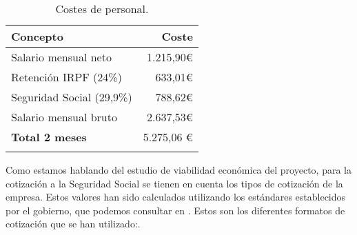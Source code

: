 \begin{longtable}[]{@{}lr@{}}
\toprule
\begin{minipage}[b]{0.38\columnwidth}\raggedright\strut
\textbf{Concepto}\strut
\end{minipage} & \begin{minipage}[b]{0.20\columnwidth}\raggedright\strut
\textbf{Coste}\strut
\end{minipage}\tabularnewline
\midrule
\endhead
\begin{minipage}[t]{0.38\columnwidth}\raggedright\strut
Salario mensual neto\strut
\end{minipage} & \begin{minipage}[t]{0.20\columnwidth}\raggedright\strut
1.215,90\euro{}\strut
\end{minipage}\tabularnewline
\begin{minipage}[t]{0.38\columnwidth}\raggedright\strut
Retención IRPF (24\%)\strut
\end{minipage} & \begin{minipage}[t]{0.20\columnwidth}\raggedright\strut
633,01\euro{}\strut
\end{minipage}\tabularnewline
\begin{minipage}[t]{0.38\columnwidth}\raggedright\strut
Seguridad Social (29,9\%)\strut
\end{minipage} & \begin{minipage}[t]{0.20\columnwidth}\raggedright\strut
788,62\euro{}\strut
\end{minipage}\tabularnewline
\begin{minipage}[t]{0.38\columnwidth}\raggedright\strut
Salario mensual bruto\strut
\end{minipage} & \begin{minipage}[t]{0.20\columnwidth}\raggedright\strut
2.637,53\euro{}\strut
\end{minipage}\tabularnewline
\midrule
\begin{minipage}[t]{0.38\columnwidth}\raggedright\strut
\textbf{Total 2 meses}\strut
\end{minipage} & \begin{minipage}[t]{0.20\columnwidth}\raggedright\strut
5.275,06 \euro{}\strut
\end{minipage}\tabularnewline
\bottomrule
\caption{Costes de personal.}
\end{longtable}

Como estamos hablando del estudio de viabilidad económica del proyecto, para la cotización a la Seguridad Social se tienen en cuenta los tipos de cotización de la empresa. Estos valores han sido calculados utilizando los estándares establecidos por el gobierno, que podemos consultar en \cite{salariogob}. Estos son los diferentes formatos de cotización que se han utilizado:.

